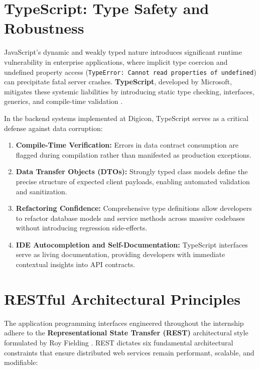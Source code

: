 \section{TypeScript: Type Safety and Robustness}
\label{sec:tech_typescript}

JavaScript's dynamic and weakly typed nature introduces significant runtime vulnerability in enterprise applications, where implicit type coercion and undefined property access (\texttt{TypeError: Cannot read properties of undefined}) can precipitate fatal server crashes. \textbf{TypeScript}, developed by Microsoft, mitigates these systemic liabilities by introducing static type checking, interfaces, generics, and compile-time validation \citep{bierman2014understanding}.

In the backend systems implemented at Digicon, TypeScript serves as a critical defense against data corruption:
\begin{enumerate}
    \item \textbf{Compile-Time Verification:} Errors in data contract consumption are flagged during compilation rather than manifested as production exceptions.
    \item \textbf{Data Transfer Objects (DTOs):} Strongly typed class models define the precise structure of expected client payloads, enabling automated validation and sanitization.
    \item \textbf{Refactoring Confidence:} Comprehensive type definitions allow developers to refactor database models and service methods across massive codebases without introducing regression side-effects.
    \item \textbf{IDE Autocompletion and Self-Documentation:} TypeScript interfaces serve as living documentation, providing developers with immediate contextual insights into API contracts.
\end{enumerate}

\section{RESTful Architectural Principles}
\label{sec:tech_rest}

The application programming interfaces engineered throughout the internship adhere to the \textbf{Representational State Transfer (REST)} architectural style formulated by Roy Fielding \citep{fielding2000architectural}. REST dictates six fundamental architectural constraints that ensure distributed web services remain performant, scalable, and modifiable:

